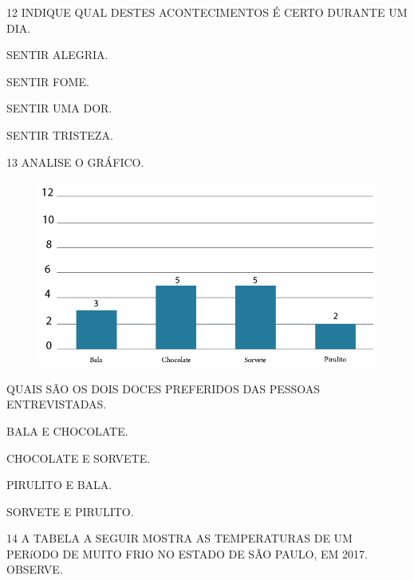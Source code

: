 \num{12} INDIQUE QUAL DESTES ACONTECIMENTOS É CERTO DURANTE UM DIA.

\begin{escolha}[itemsep=0pt]
\item SENTIR ALEGRIA.

\item SENTIR FOME.

\item SENTIR UMA DOR.

\item SENTIR TRISTEZA.
\end{escolha}

\pagebreak
\num{13} ANALISE O GRÁFICO.

\begin{figure}[htpb!]
\includegraphics[width=\textwidth]{./media/SAEB_1ANO_MAT_FIGURA118.png}
\end{figure}

QUAIS SÃO OS DOIS DOCES PREFERIDOS DAS PESSOAS ENTREVISTADAS.

\begin{escolha}[itemsep=0pt]
\item BALA E CHOCOLATE.

\item CHOCOLATE E SORVETE.

\item PIRULITO E BALA.

\item SORVETE E PIRULITO.
\end{escolha}

\pagebreak
\num{14} A TABELA A SEGUIR MOSTRA AS TEMPERATURAS DE UM PERíODO DE MUITO FRIO NO ESTADO DE SÃO
PAULO, EM 2017. OBSERVE.



